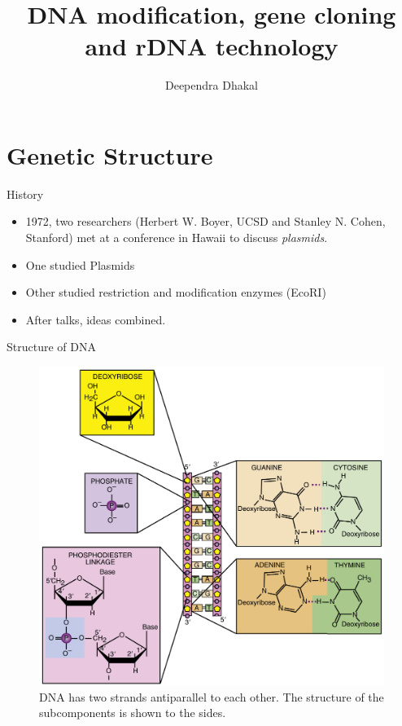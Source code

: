 \documentclass[
  ignorenonframetext,
  aspectratio=169]{beamer}
\title{DNA modification, gene cloning and rDNA technology}
\author{Deependra Dhakal}
\date{}
\institute{Agriculture and Forestry
University \and \href{mailto:ddhakal.rookie@gmail.com}{\nolinkurl{ddhakal.rookie@gmail.com}} \and \url{https://rookie.rbind.io/}}
\providecommand{\tightlist}{%
  \setlength{\itemsep}{0pt}\setlength{\parskip}{0pt}}
\begin{document}
\frame{\titlepage}

\begin{frame}[allowframebreaks]
  \tableofcontents[hideallsubsections]
\end{frame}
\hypertarget{genetic-structure}{%
\section{Genetic Structure}\label{genetic-structure}}

\begin{frame}{History}
\protect\hypertarget{history}{}
\begin{itemize}
\tightlist
\item
  1972, two researchers (Herbert W. Boyer, UCSD and Stanley N. Cohen,
  Stanford) met at a conference in Hawaii to discuss \emph{plasmids}.
\item
  One studied Plasmids
\item
  Other studied restriction and modification enzymes (EcoRI)
\item
  After talks, ideas combined.
\end{itemize}
\end{frame}

\begin{frame}{Structure of DNA}
\protect\hypertarget{structure-of-dna}{}
\begin{figure}
\includegraphics[width=0.45\linewidth]{./../images/dna_structure_a} \caption{DNA has two strands antiparallel to each other. The structure of the subcomponents is shown to the sides.}\label{fig:nucleic-acid-dna}
\end{figure}
\end{frame}
\end{document}
